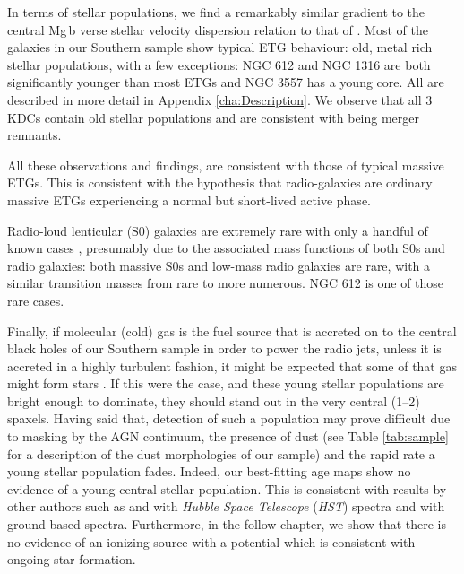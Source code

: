 	In terms of stellar populations, we find a remarkably similar gradient to the central Mg\,b verse stellar velocity dispersion relation to that of \citet{Ziegler1997}. Most of the galaxies in our Southern sample show typical ETG behaviour: old, metal rich stellar populations, with a few exceptions: NGC 612 and NGC 1316 are both significantly younger than most ETGs and NGC 3557 has a young core. All are described in more detail in Appendix \ref{cha:Description}. We observe that all 3 KDCs contain old stellar populations and are consistent with being merger remnants. 

	All these observations and findings, are consistent with those of typical massive ETGs. This is consistent with the hypothesis that radio-galaxies are ordinary massive ETGs experiencing a normal but short-lived active phase. 

	Radio-loud lenticular (S0) galaxies are extremely rare with only a handful of known cases \citep[e.g.][]{Heckman1982, Morganti2011}, presumably due to the associated mass functions of both S0s and radio galaxies: both massive S0s and low-mass radio galaxies are rare, with a similar transition masses from rare to more numerous. NGC 612 is one of those rare cases.

	Finally, if molecular (cold) gas is the fuel source that is accreted on to the central black holes of our Southern sample in order to power the radio jets, unless it is accreted in a highly turbulent fashion, it might be expected that some of that gas might form stars \citep[e.g.][]{Collin1999, Diamond-Stanic2012, LaMassa2013}. If this were the case, and these young stellar populations are bright enough to dominate, they should stand out in the very central (1--2) spaxels. Having said that, detection of such a population may prove difficult due to masking by the AGN continuum, the presence of dust (see Table \ref{tab:sample} for a description of the dust morphologies of our sample) and the rapid rate a young stellar population fades. Indeed, our best-fitting age maps show no evidence of a young central stellar population. This is consistent with results by other authors such as \citet{GonzalezDelgado2004} and \citet{Sarzi2005b} with \textit{Hubble Space Telescope} (\textit{HST}) spectra and \citet{CidFernandes2004} with ground based spectra. Furthermore, in the follow chapter, we show that there is no evidence of an ionizing source with a potential which is consistent with ongoing star formation. 